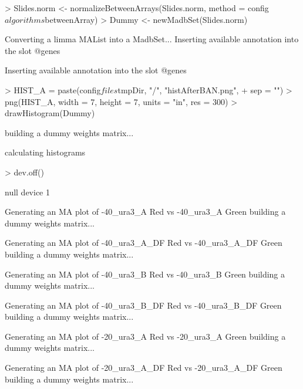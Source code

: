 \documentclass[titlepage]{article}
\begin{document}
\begin{Schunk}
\begin{Sinput}
> Slides.norm <- normalizeBetweenArrays(Slides.norm, method = config$algorithms$betweenArray)
> Dummy <- newMadbSet(Slides.norm)
\end{Sinput}
\begin{Soutput}
Converting a limma MAList into a MadbSet...
Inserting available annotation into the slot @genes

Inserting available annotation into the slot @genes
\end{Soutput}
\begin{Sinput}
> HIST_A = paste(config$files$tmpDir, "/", "histAfterBAN.png", 
+     sep = "")
> png(HIST_A, width = 7, height = 7, units = "in", res = 300)
> drawHistogram(Dummy)
\end{Sinput}
\begin{Soutput}
building a dummy weights matrix... 

calculating histograms 
\end{Soutput}
\begin{Sinput}
> dev.off()
\end{Sinput}
\begin{Soutput}
null device 
          1 
\end{Soutput}
\begin{Soutput}
Generating an MA plot of  -40_ura3_A Red vs -40_ura3_A Green 
building a dummy weights matrix... 

Generating an MA plot of  -40_ura3_A_DF Red vs -40_ura3_A_DF Green 
building a dummy weights matrix... 

Generating an MA plot of  -40_ura3_B Red vs -40_ura3_B Green 
building a dummy weights matrix... 

Generating an MA plot of  -40_ura3_B_DF Red vs -40_ura3_B_DF Green 
building a dummy weights matrix... 

Generating an MA plot of  -20_ura3_A Red vs -20_ura3_A Green 
building a dummy weights matrix... 

Generating an MA plot of  -20_ura3_A_DF Red vs -20_ura3_A_DF Green 
building a dummy weights matrix... 


\end{Soutput}
\end{Schunk}
\end{document}
